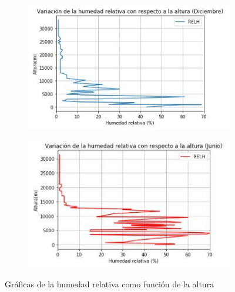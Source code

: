 \documentclass[a4paper]{article}
\begin{document}
\begin{figure}[ht!]
\centering
\begin{subfigure}{0.49\textwidth}
\centering
\includegraphics[width = \textwidth]{humedad_relativa_dec.JPG}

\end{subfigure}
\begin{subfigure}{0.49\textwidth}
\centering
\includegraphics[width = \textwidth]{humedad_relativa_jun.JPG}

\end{subfigure}
\caption{Gráficas de la humedad relativa como función de la altura}
\label{fig:combined}
\end{figure}

\newpage
\end{document}
